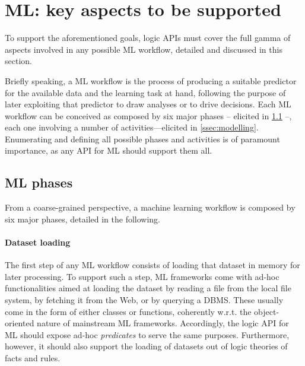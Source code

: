 \documentclass{article}
\begin{document}
\section{ML: key aspects to be supported}
\label{sec:requirements}

To support the aforementioned goals, logic APIs must cover the full gamma of aspects involved in any possible ML workflow, detailed and discussed in this section.

Briefly speaking, a ML workflow is the process of producing a suitable predictor for the available data and the learning task at hand, following the purpose of later exploiting that predictor to draw analyses or to drive decisions.
%
Each ML workflow can be conceived as composed by six major phases -- elicited in \cref{ssec:ml-phases} --, each one involving a number of activities---elicited in \cref{ssec:modelling}.
%
Enumerating and defining all possible phases and activities is of paramount importance, as any API for ML should support them all.

\subsection{ML phases}
\label{ssec:ml-phases}

From a coarse-grained perspective, a machine learning workflow is composed by six major phases, detailed in the following.

\paragraph{Dataset loading}
%
The first step of any ML workflow consists of loading that dataset in memory for later processing.
%
To support such a step, ML frameworks come with ad-hoc functionalities aimed at loading the dataset by reading a file from the local file system, by fetching it from the Web, or by querying a DBMS.
%
These usually come in the form of either classes or functions, coherently w.r.t. the object-oriented nature of mainstream ML frameworks.
%
Accordingly, the logic API for ML should expose ad-hoc \emph{predicates} to serve the same purposes.
%
Furthermore, however, it should also support the loading of datasets out of logic theories of facts and rules.
\end{document}
